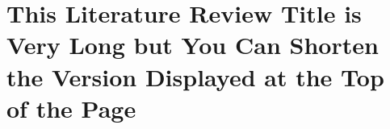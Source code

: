 \chapter{This Literature Review Title is Very Long but You Can Shorten the Version Displayed at the Top of the Page} 

\label{chap:lit-rev}

\lipsum[1]